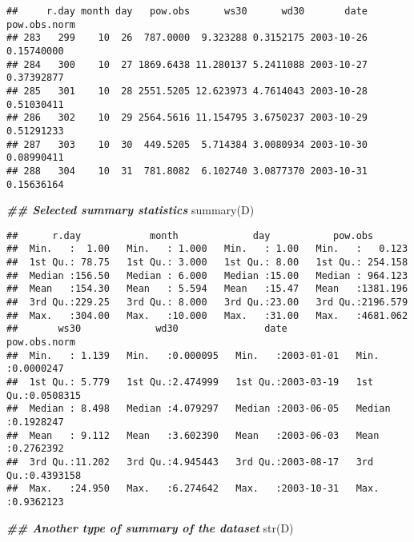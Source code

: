 \documentclass[
]{article}
\newenvironment{Shaded}{\begin{snugshade}}{\end{snugshade}}
\newcommand{\DocumentationTok}[1]{\textcolor[rgb]{0.56,0.35,0.01}{\textbf{\textit{#1}}}}
\newcommand{\FunctionTok}[1]{\textcolor[rgb]{0.00,0.00,0.00}{#1}}
\newcommand{\NormalTok}[1]{#1}
\begin{document}
\begin{verbatim}
##     r.day month day   pow.obs      ws30      wd30       date pow.obs.norm
## 283   299    10  26  787.0000  9.323288 0.3152175 2003-10-26   0.15740000
## 284   300    10  27 1869.6438 11.280137 5.2411088 2003-10-27   0.37392877
## 285   301    10  28 2551.5205 12.623973 4.7614043 2003-10-28   0.51030411
## 286   302    10  29 2564.5616 11.154795 3.6750237 2003-10-29   0.51291233
## 287   303    10  30  449.5205  5.714384 3.0080934 2003-10-30   0.08990411
## 288   304    10  31  781.8082  6.102740 3.0877370 2003-10-31   0.15636164
\end{verbatim}

\begin{Shaded}
\begin{Highlighting}[]
\DocumentationTok{\#\# Selected summary statistics}
\FunctionTok{summary}\NormalTok{(D)}
\end{Highlighting}
\end{Shaded}

\begin{verbatim}
##      r.day            month             day           pow.obs        
##  Min.   :  1.00   Min.   : 1.000   Min.   : 1.00   Min.   :   0.123  
##  1st Qu.: 78.75   1st Qu.: 3.000   1st Qu.: 8.00   1st Qu.: 254.158  
##  Median :156.50   Median : 6.000   Median :15.00   Median : 964.123  
##  Mean   :154.30   Mean   : 5.594   Mean   :15.47   Mean   :1381.196  
##  3rd Qu.:229.25   3rd Qu.: 8.000   3rd Qu.:23.00   3rd Qu.:2196.579  
##  Max.   :304.00   Max.   :10.000   Max.   :31.00   Max.   :4681.062  
##       ws30             wd30               date             pow.obs.norm      
##  Min.   : 1.139   Min.   :0.000095   Min.   :2003-01-01   Min.   :0.0000247  
##  1st Qu.: 5.779   1st Qu.:2.474999   1st Qu.:2003-03-19   1st Qu.:0.0508315  
##  Median : 8.498   Median :4.079297   Median :2003-06-05   Median :0.1928247  
##  Mean   : 9.112   Mean   :3.602390   Mean   :2003-06-03   Mean   :0.2762392  
##  3rd Qu.:11.202   3rd Qu.:4.945443   3rd Qu.:2003-08-17   3rd Qu.:0.4393158  
##  Max.   :24.950   Max.   :6.274642   Max.   :2003-10-31   Max.   :0.9362123
\end{verbatim}

\begin{Shaded}
\begin{Highlighting}[]
\DocumentationTok{\#\# Another type of summary of the dataset}
\FunctionTok{str}\NormalTok{(D)}
\end{Highlighting}
\end{Shaded}
\end{document}
